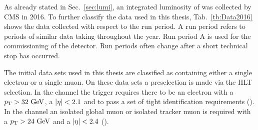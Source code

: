 As already stated in Sec.~\ref{sec:lumi}, an integrated luminosity of \Lumi{} was collected by CMS in 2016.
To further classify the data used in this thesis, Tab.~\ref{tb:Data2016} shows the data collected with respect to the run period.
A run period refers to periods of similar data taking throughout the year.
Run period A is used for the commissioning of the detector.
Run periods often change after a short technical stop has occurred.

The initial data sets used in this thesis are classified as containing either a single electron or a single muon.
On these data sets a preselection is made via the HLT selection.
In the \eJets{} channel the trigger requires there to be an electron with a $p_{\mathrm{T}}>32\mathrm{~Ge\hspace{-.08em}V}^{}$, a $\lvert \eta \rvert<2.1$ and to pass a set of tight identification requirements (\eTrigger{}).
In the \muJets{} channel an isolated global muon or isolated tracker muon is required with a $p_{\mathrm{T}} > 24\mathrm{~Ge\hspace{-.08em}V}^{}$ and a $\lvert \eta \rvert < 2.4$ (\muTrigger{}).







